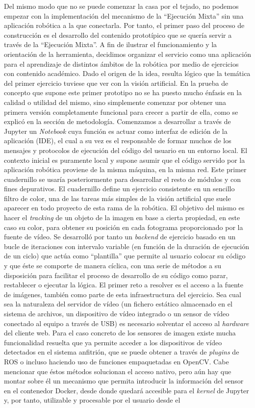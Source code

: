 Del mismo modo que no se puede comenzar la casa por el tejado, no podemos empezar con la implementación del mecanismo de la ``Ejecución Mixta'' sin una aplicación robótica a la que conectarla. Por tanto, el primer paso del proceso de construcción es el desarrollo del contenido prototípico que se quería servir a través de la ``Ejecución Mixta''. A fin de ilustrar el funcionamiento y la orientación de la herramienta, decidimos organizar el servicio como una aplicación para el aprendizaje de distintos ámbitos de la robótica por medio de ejercicios con contenido académico. Dado el origen de la idea, resulta lógico que la temática del primer ejercicio tuviese que ver con la visión artificial. En la prueba de concepto que supone este primer prototipo no se ha puesto mucho énfasis en la calidad o utilidad del mismo, sino simplemente comenzar por obtener una primera versión completamente funcional para crecer a partir de ella, como se explicó en la sección de metodología. Comenzamos a desarrollar a través de Jupyter un \textit{Notebook} cuya función es actuar como interfaz de edición de la aplicación (IDE), el cual a su vez es el responsable de formar muchos de los mensajes y protocolos de ejecución del código del usuario en un entorno local. El contexto inicial es puramente local y supone asumir que el código servido por la aplicación robótica proviene de la misma máquina, en la misma red. Este primer cuadernillo se usaría posteriormente para desarrollar el resto de módulos y con fines depurativos. El cuadernillo define un ejercicio consistente en un sencillo filtro de color, una de las tareas más simples de la visión artificial que suele aparecer en todo proyecto de esta rama de la robótica. El objetivo del mismo es hacer el \textit{tracking} de un objeto de la imagen en base a cierta propiedad, en este caso su color, para obtener su posición en cada fotograma proporcionado por la fuente de vídeo. Se desarrolló por tanto un \textit{backend} de ejercicio basado en un bucle de iteraciones con intervalo variable (en función de la duración de ejecución de un ciclo) que actúa como ``plantilla'' que permite al usuario colocar su código y que éste se comporte de manera cíclica, con una serie de métodos a su disposición para facilitar el proceso de desarrollo de su código como parar, restablecer o ejecutar la lógica. El primer reto a resolver es el acceso a la fuente de imágenes, también como parte de esta infraestructura del ejercicio. Sea cual sea la naturaleza del servidor de vídeo (un fichero estático almacenado en el sistema de archivos, un dispositivo de vídeo integrado o un sensor de vídeo conectado al equipo a través de USB) es necesario solventar el acceso al \textit{hardware} del cliente web. Para el caso concreto de los sensores de imagen existe mucha funcionalidad resuelta que ya permite acceder a los dispositivos de vídeo detectados en el sistema anfitrión, que se puede obtener a través de \textit{plugins} de ROS o incluso haciendo uso de funciones empaquetadas en OpenCV. Cabe mencionar que éstos métodos solucionan el acceso nativo, pero aún hay que montar sobre él un mecanismo que permita introducir la información del sensor en el contenedor Docker, desde donde quedará accesible para el \textit{kernel} de Jupyter y, por tanto, utilizable y procesable por el usuario desde el 